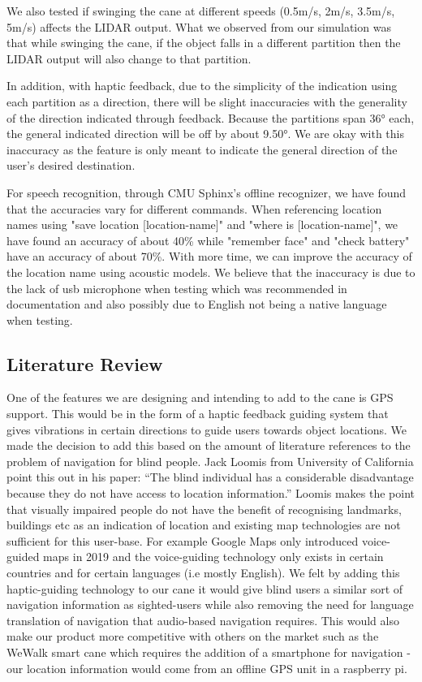 \documentclass{article}
\begin{document}
We also tested if swinging the cane at different speeds (0.5m/s, 2m/s, 3.5m/s, 5m/s) affects the LIDAR output. What we observed from our simulation was that while swinging the cane, if the object falls in a different partition then the LIDAR output will also change to that partition. 

In addition, with haptic feedback, due to the simplicity of the indication using each partition as a direction, there will be slight inaccuracies with the generality of the direction indicated through feedback. Because the partitions span 36° each, the general indicated direction will be off by about 9.50°. We are okay with this inaccuracy as the feature is only meant to indicate the general direction of the user's desired destination.

For speech recognition, through CMU Sphinx's offline recognizer, we have found that the accuracies vary for different commands. When referencing location names using "save location [location-name]" and "where is [location-name]", we have found an accuracy of about 40\% while "remember face" and "check battery" have an accuracy of about 70\%. With more time, we can improve the accuracy of the location name using acoustic models. We believe that the inaccuracy is due to the lack of usb microphone when testing which was recommended in documentation and also possibly due to English not being a native language when testing.

\subsection{Literature Review}

One of the features we are designing and intending to add to the cane is GPS support. This would be in the form of a haptic feedback guiding system that gives vibrations in certain directions to guide users towards object locations. We made the decision to add this based on the amount of literature references to the problem of navigation for blind people. Jack Loomis from University of California point this out in his paper: “The blind individual has a considerable disadvantage because they do not have access to location information.” \cite{sugiyama2019} Loomis makes the point that visually impaired people do not have the benefit of recognising landmarks, buildings etc as an indication of location and existing map technologies are not sufficient for this user-base. For example Google Maps only introduced voice-guided maps in 2019 and the voice-guiding technology only exists in certain countries and for certain languages (i.e mostly English). We felt by adding this haptic-guiding technology to our cane it would give blind users a similar sort of navigation information as sighted-users while also removing the need for language translation of navigation that audio-based navigation requires. This would also make our product more competitive with others on the market such as the WeWalk smart cane which requires the addition of a smartphone for navigation - our location information would come from an offline GPS unit in a raspberry pi. \cite{wewalk2020}
 
\end{document}
